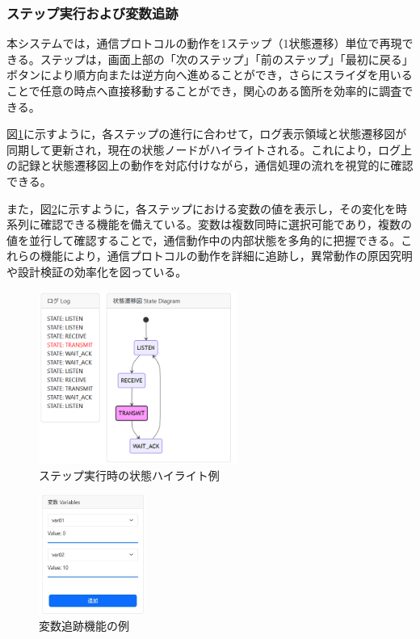 \documentclass[technicalreport]{ieicej}
\begin{document}
\subsubsection{ステップ実行および変数追跡}
本システムでは，通信プロトコルの動作を1ステップ（1状態遷移）単位で再現できる。ステップは，画面上部の「次のステップ」「前のステップ」「最初に戻る」ボタンにより順方向または逆方向へ進めることができ，さらにスライダを用いることで任意の時点へ直接移動することができ，関心のある箇所を効率的に調査できる。

図\ref{fig:viewer-ui-step}に示すように，各ステップの進行に合わせて，ログ表示領域と状態遷移図が同期して更新され，現在の状態ノードがハイライトされる。これにより，ログ上の記録と状態遷移図上の動作を対応付けながら，通信処理の流れを視覚的に確認できる。

また，図\ref{fig:var-tracking}に示すように，各ステップにおける変数の値を表示し，その変化を時系列に確認できる機能を備えている。変数は複数同時に選択可能であり，複数の値を並行して確認することで，通信動作中の内部状態を多角的に把握できる。これらの機能により，通信プロトコルの動作を詳細に追跡し，異常動作の原因究明や設計検証の効率化を図っている。

\begin{figure}[h]
\centering
\includegraphics[width=65mm]{./images/step_22.png}
\caption{ステップ実行時の状態ハイライト例}
\label{fig:viewer-ui-step}
\end{figure}

\begin{figure}[h]
\centering
\includegraphics[width=35mm]{./images/var_log2.jpg}
\caption{変数追跡機能の例}
\label{fig:var-tracking}
\end{figure}
\end{document}
